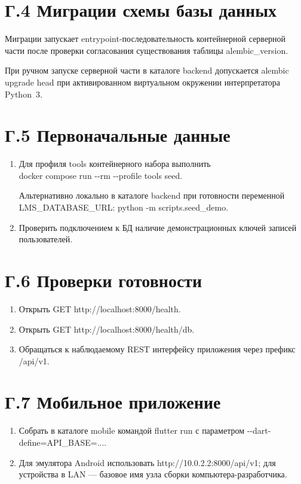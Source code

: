 \section*{Г.4 Миграции схемы базы данных}

Миграции запускает entrypoint-последовательность контейнерной серверной части после проверки согласования существования таблицы alembic\_version.

При ручном запуске серверной части в каталоге backend допускается alembic upgrade head при активированном виртуальном окружении интерпретатора Python~3\cite{alembic_docs,docker_compose_docs}.

\section*{Г.5 Первоначальные данные}

\begin{enumerate}
  \item Для профиля tools контейнерного набора выполнить
  \\ docker compose run {-}{-}rm {-}{-}profile tools seed.

  Альтернативно локально в каталоге backend при готовности переменной LMS\_DATABASE\_URL: python -m scripts.seed\_demo.
  \item Проверить подключением к БД наличие демонстрационных ключей записей пользователей.
\end{enumerate}

\section*{Г.6 Проверки готовности}

\begin{enumerate}
  \item Открыть GET http://localhost:8000/health.
  \item Открыть GET http://localhost:8000/health/db.
  \item Обращаться к наблюдаемому REST интерфейсу приложения через префикс /api/v1.
\end{enumerate}

\section*{Г.7 Мобильное приложение}

\begin{enumerate}
  \item Собрать в каталоге mobile командой flutter run с параметром {-}{-}dart-define=API\_BASE=....
  \item Для эмулятора Android использовать http://10.0.2.2:8000/api/v1; для устройства в LAN --- базовое имя узла сборки компьютера-разработчика.
\end{enumerate}

